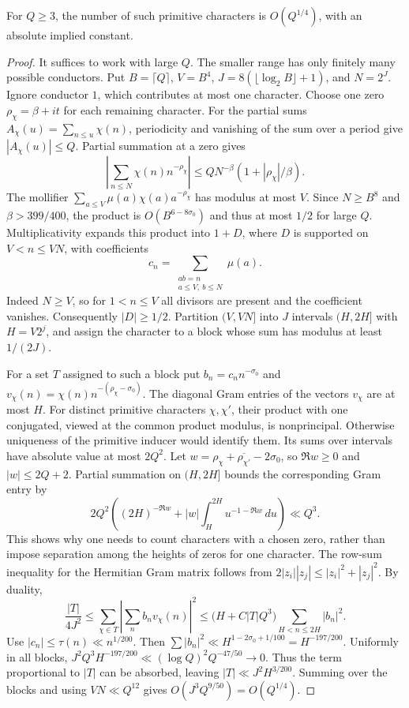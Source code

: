 \begin{lemma}\label{sup:density}
For \(Q\ge3\), the number of such primitive characters is \(O(Q^{1/4})\), with an absolute implied constant.
\end{lemma}
\begin{proof}
It suffices to work with large \(Q\). The smaller range has only finitely many possible conductors. Put \(B=\lceil Q\rceil\), \(V=B^4\), \(J=8(\lfloor\log_2B\rfloor+1)\), and \(N=2^J\). Ignore conductor \(1\), which contributes at most one character. Choose one zero \(\rho_\chi=\beta+it\) for each remaining character. For the partial sums \(A_\chi(u)=\sum_{n\le u}\chi(n)\), periodicity and vanishing of the sum over a period give \(|A_\chi(u)|\le Q\). Partial summation at a zero gives
\[
 \left|\sum_{n\le N}\chi(n)n^{-\rho_\chi}\right|
 \le Q N^{-\beta}(1+|\rho_\chi|/\beta).
\]
The mollifier \(\sum_{a\le V}\mu(a)\chi(a)a^{-\rho_\chi}\) has modulus at most \(V\). Since \(N\ge B^8\) and \(\beta>399/400\), the product is \(O(B^{6-8\sigma_0})\) and thus at most \(1/2\) for large \(Q\). Multiplicativity expands this product into \(1+D\), where \(D\) is supported on \(V<n\le VN\), with coefficients
\[
 c_n=\sum_{\substack{ab=n\\a\le V,\ b\le N}}\mu(a).
\]
Indeed \(N\ge V\), so for \(1<n\le V\) all divisors are present and the coefficient vanishes. Consequently \(|D|\ge1/2\). Partition \((V,VN]\) into \(J\) intervals \((H,2H]\) with \(H=V2^j\), and assign the character to a block whose sum has modulus at least \(1/(2J)\).

For a set \(T\) assigned to such a block put \(b_n=c_n n^{-\sigma_0}\) and \(v_\chi(n)=\chi(n)n^{-(\rho_\chi-\sigma_0)}\). The diagonal Gram entries of the vectors \(v_\chi\) are at most \(H\). For distinct primitive characters \(\chi,\chi'\), their product with one conjugated, viewed at the common product modulus, is nonprincipal. Otherwise uniqueness of the primitive inducer would identify them. Its sums over intervals have absolute value at most \(2Q^2\). Let \(w=\rho_\chi+\overline{\rho_{\chi'}}-2\sigma_0\), so \(\Re w\ge0\) and \(|w|\le2Q+2\). Partial summation on \((H,2H]\) bounds the corresponding Gram entry by
\[
 2Q^2\left((2H)^{-\Re w}+|w|\int_H^{2H}u^{-1-\Re w}\,du\right)\ll Q^3 .
\]
This shows why one needs to count characters with a chosen zero, rather than impose separation among the heights of zeros for one character. The row-sum inequality for the Hermitian Gram matrix follows from \(2|z_i||z_j|\le |z_i|^2+|z_j|^2\). By duality,
\[
 \frac{|T|}{4J^2}\le \sum_{\chi\in T}\left|\sum_n b_n v_\chi(n)\right|^2
 \le\bigl(H+C|T|Q^3\bigr)\sum_{H<n\le2H}|b_n|^2 .
\]
Use \(|c_n|\le\tau(n)\ll n^{1/200}\). Then \(\sum|b_n|^2\ll H^{1-2\sigma_0+1/100}=H^{-197/200}\). Uniformly in all blocks,
\(J^2 Q^3 H^{-197/200}\ll(\log Q)^2 Q^{-47/50}\to0\).
Thus the term proportional to \(|T|\) can be absorbed, leaving \(|T|\ll J^2H^{3/200}\). Summing over the blocks and using \(VN\ll Q^{12}\) gives \(O(J^3Q^{9/50})=O(Q^{1/4})\).
\end{proof}
